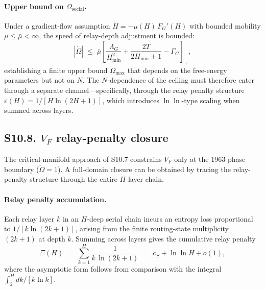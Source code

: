 \documentclass[11pt]{article}
\begin{document}
\paragraph{Upper bound on $\Omega_{\mathrm{social}}$.}
Under a gradient-flow assumption $\dot{H} = -\mu(H)\,F_G'(H)$ with bounded
mobility $\mu \le \bar\mu < \infty$, the speed of relay-depth adjustment is
bounded:
\[
|\dot\Omega| \;\le\; \bar\mu\!\left[\frac{\Lambda_G}{H_{\min}^2}
+ \frac{2T}{2H_{\min}+1} - \Gamma_G\right]_+,
\]
establishing a finite upper bound $\Omega_{\max}$ that depends on the free-energy
parameters but not on $N$. The $N$-dependence of the ceiling must therefore enter
through a separate channel---specifically, through the relay penalty structure
$\varepsilon(H) = 1/[H\ln(2H+1)]$, which introduces $\ln\ln$-type scaling
when summed across layers.


\subsection*{S10.8. $V_F$ relay-penalty closure}

The critical-manifold approach of S10.7 constrains $V_F$ only at the 1963
phase boundary ($\tilde\Omega=1$). A full-domain closure can be obtained by
tracing the relay-penalty structure through the entire $H$-layer chain.

\paragraph{Relay penalty accumulation.}
Each relay layer $k$ in an $H$-deep serial chain incurs an entropy loss
proportional to $1/[k\ln(2k+1)]$, arising from the finite routing-state
multiplicity $(2k+1)$ at depth $k$. Summing across layers gives the
cumulative relay penalty
\[
\Xi(H) \;=\; \sum_{k=1}^{H} \frac{1}{k\,\ln(2k+1)}
\;=\; c_\Xi + \ln\!\ln H + o(1),
\]
where the asymptotic form follows from comparison with the integral
$\int_2^H dk/[k\ln k]$.
\end{document}
